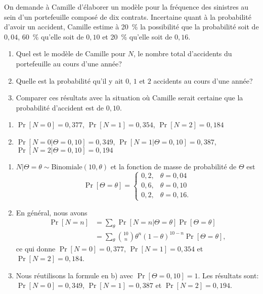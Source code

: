 \begin{exercice}
  On demande à Camille d'élaborer un modèle pour la fréquence des
  sinistres au sein d'un portefeuille composé de dix contrats.
  Incertaine quant à la probabilité d'avoir un accident, Camille
  estime à 20~\% la possibilité que la probabilité soit de $0,04$,
  60~\% qu'elle soit de $0,10$ et 20~\% qu'elle soit de $0,16$.
  \begin{enumerate}
  \item Quel est le modèle de Camille pour $N$, le nombre total
    d'accidents du portefeuille au cours d'une année?
  \item Quelle est la probabilité qu'il y ait $0$, $1$ et $2$
    accidents au cours d'une année?
  \item Comparer ces résultats avec la situation où Camille serait
    certaine que la probabilité d'accident est de $0,10$.
  \end{enumerate}
  \begin{rep}
    \begin{enumerate}
    \item $\Pr[N = 0] = 0,377$, $\Pr[N = 1] = 0,354$, $\Pr[N = 2] =
      0,184$
    \item $\Pr[N = 0|\Theta = 0,10] = 0,349$, $\Pr[N = 1|\Theta =
      0,10] = 0,387$, $\Pr[N = 2|\Theta = 0,10] = 0,194$
    \end{enumerate}
  \end{rep}
  \begin{sol}
    \begin{enumerate}
    \item $N|\Theta = \theta \sim \text{Binomiale}(10, \theta)$ et la
      fonction de masse de probabilité de $\Theta$ est
      \begin{equation*}
        \Pr[\Theta = \theta] =
        \begin{cases}
          0,2, & \theta = 0,04 \\
          0,6, & \theta = 0,10 \\
          0,2, & \theta = 0,16.
        \end{cases}
      \end{equation*}
    \item En général, nous avons
      \begin{align*}
        \Pr[N = n] &= \sum_\theta \Pr[N = n|\Theta = \theta]
        \Pr[\Theta = \theta] \\
        &= \sum_\theta \binom{10}{n} \theta^n (1 - \theta)^{10-n}
        \Pr[\Theta = \theta],
      \end{align*}
      ce qui donne $\Pr[N = 0] = 0,377$, $\Pr[N = 1] = 0,354$ et
      $\Pr[N = 2] = 0,184$.
    \item Nous réutilisons la formule en b) avec
      $\Pr[\Theta = 0,10] = 1$. Les résultats sont:
      $\Pr[N = 0] = 0,349$, $\Pr[N = 1] = 0,387$ et
      $\Pr[N = 2] = 0,194$.
    \end{enumerate}
  \end{sol}
\end{exercice}

